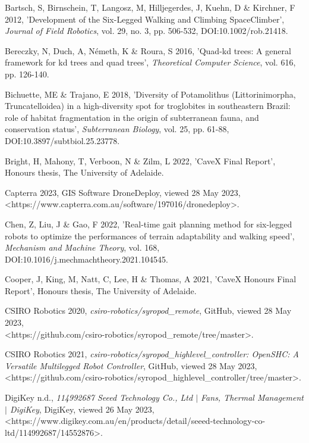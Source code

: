 Bartsch, S, Birnschein, T, Langosz, M, Hilljegerdes, J, Kuehn, D \& Kirchner, F 2012, 'Development of the Six-Legged Walking and Climbing SpaceClimber', \textit{Journal of Field Robotics}, vol. 29, no. 3, pp. 506-532, DOI:10.1002/rob.21418.

Bereczky, N, Duch, A, Németh, K \& Roura, S 2016, 'Quad-kd trees: A general framework for kd trees and quad trees', \textit{Theoretical Computer Science}, vol. 616, pp. 126-140.

Bichuette, ME \& Trajano, E 2018, 'Diversity of Potamolithus (Littorinimorpha, Truncatelloidea) in a high-diversity spot for troglobites in southeastern Brazil: role of habitat fragmentation in the origin of subterranean fauna, and conservation status', \textit{Subterranean Biology}, vol. 25, pp. 61-88, DOI:10.3897/subtbiol.25.23778.

Bright, H, Mahony, T, Verboon, N \& Zilm, L 2022, ’CaveX Final Report’, Honours thesis, The University of
Adelaide.

Capterra 2023, GIS Software DroneDeploy, viewed 28 May 2023, \\ \textless https://www.capterra.com.au/software/197016/dronedeploy\textgreater.

Chen, Z, Liu, J \& Gao, F 2022, 'Real-time gait planning method for six-legged robots to optimize the performances of terrain adaptability and walking speed', \textit{Mechanism and Machine Theory}, vol. 168, DOI:10.1016/j.mechmachtheory.2021.104545.

Cooper, J, King, M, Natt, C, Lee, H \& Thomas, A 2021, 'CaveX Honours Final Report', Honours thesis, The
University of Adelaide.

CSIRO Robotics 2020, \textit{csiro-robotics/syropod\_remote}, GitHub, viewed 28 May 2023, \\ \textless https://github.com/csiro-robotics/syropod\_remote/tree/master\textgreater.

CSIRO Robotics 2021, \textit{csiro-robotics/syropod\_highlevel\_controller: OpenSHC: A Versatile Multilegged Robot Controller}, GitHub, viewed 28 May 2023, \\ \textless https://github.com/csiro-robotics/syropod\_highlevel\_controller/tree/master\textgreater.

DigiKey n.d., \textit{114992687 Seeed Technology Co., Ltd $\mid$ Fans, Thermal Management $\mid$ DigiKey}, DigiKey, viewed 26 May 2023, \textless https://www.digikey.com.au/en/products/detail/seeed-technology-co-ltd/114992687/14552876\textgreater.

